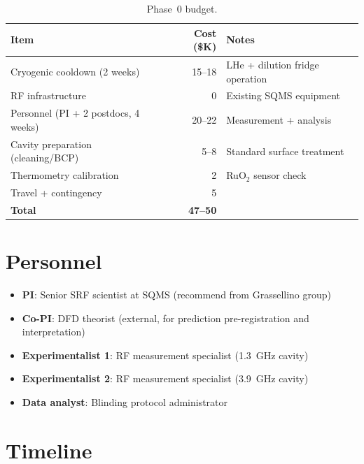 \documentclass[11pt]{article}
\theoremstyle{definition}
\theoremstyle{remark}
\begin{document}
\begin{table}[H]
\centering
\caption{Phase~0 budget.}
\renewcommand{\arraystretch}{1.3}
\begin{tabular}{@{}lrl@{}}
\toprule
\textbf{Item} & \textbf{Cost (\$K)} & \textbf{Notes} \\
\midrule
Cryogenic cooldown (2 weeks) & 15--18 & LHe + dilution fridge
  operation \\
RF infrastructure & 0 & Existing SQMS equipment \\
Personnel (PI + 2 postdocs, 4 weeks) & 20--22 & Measurement +
  analysis \\
Cavity preparation (cleaning/BCP) & 5--8 & Standard surface
  treatment \\
Thermometry calibration & 2 & RuO$_2$ sensor check \\
Travel + contingency & 5 & \\
\midrule
\textbf{Total} & \textbf{47--50} & \\
\bottomrule
\end{tabular}
\end{table}


\section{Personnel}

\begin{itemize}[nosep]
\item \textbf{PI}: Senior SRF scientist at SQMS (recommend from
  Grassellino group)
\item \textbf{Co-PI}: DFD theorist (external, for prediction
  pre-registration and interpretation)
\item \textbf{Experimentalist 1}: RF measurement specialist
  (1.3~GHz cavity)
\item \textbf{Experimentalist 2}: RF measurement specialist
  (3.9~GHz cavity)
\item \textbf{Data analyst}: Blinding protocol administrator
\end{itemize}


\section{Timeline}
\end{document}
